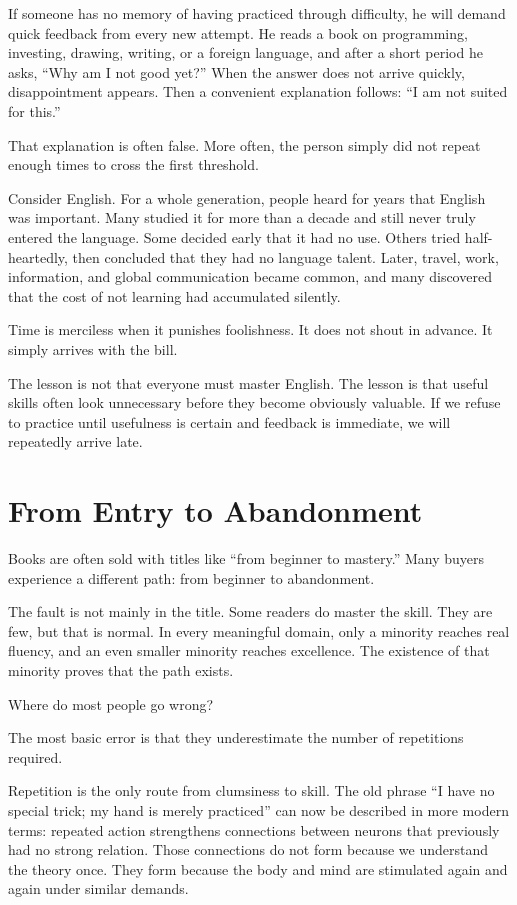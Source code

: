 If someone has no memory of having practiced through difficulty, he will demand quick feedback from every new attempt. He reads a book on programming, investing, drawing, writing, or a foreign language, and after a short period he asks, ``Why am I not good yet?'' When the answer does not arrive quickly, disappointment appears. Then a convenient explanation follows: ``I am not suited for this.''

That explanation is often false. More often, the person simply did not repeat enough times to cross the first threshold.

Consider English. For a whole generation, people heard for years that English was important. Many studied it for more than a decade and still never truly entered the language. Some decided early that it had no use. Others tried half-heartedly, then concluded that they had no language talent. Later, travel, work, information, and global communication became common, and many discovered that the cost of not learning had accumulated silently.

Time is merciless when it punishes foolishness. It does not shout in advance. It simply arrives with the bill.

The lesson is not that everyone must master English. The lesson is that useful skills often look unnecessary before they become obviously valuable. If we refuse to practice until usefulness is certain and feedback is immediate, we will repeatedly arrive late.

\section*{From Entry to Abandonment}

Books are often sold with titles like ``from beginner to mastery.'' Many buyers experience a different path: from beginner to abandonment.

The fault is not mainly in the title. Some readers do master the skill. They are few, but that is normal. In every meaningful domain, only a minority reaches real fluency, and an even smaller minority reaches excellence. The existence of that minority proves that the path exists.

Where do most people go wrong?

The most basic error is that they underestimate the number of repetitions required.

Repetition is the only route from clumsiness to skill. The old phrase ``I have no special trick; my hand is merely practiced'' can now be described in more modern terms: repeated action strengthens connections between neurons that previously had no strong relation. Those connections do not form because we understand the theory once. They form because the body and mind are stimulated again and again under similar demands.

